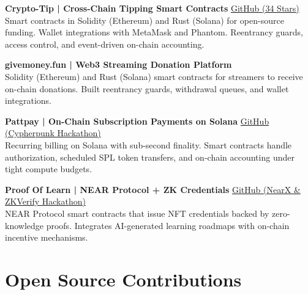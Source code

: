 \documentclass[10pt,a4paper]{article}
\begin{document}
\vspace{2pt}
\noindent\textbf{\footnotesize Crypto-Tip | Cross-Chain Tipping Smart Contracts} \textbullet{} {\footnotesize\href{https://github.com/Dnreikronos/crypto-tip}{GitHub (34 Stars)}}\\
{\footnotesize Smart contracts in Solidity (Ethereum) and Rust (Solana) for open-source funding. Wallet integrations with MetaMask and Phantom. Reentrancy guards, access control, and event-driven on-chain accounting.}

\vspace{2pt}
\noindent\textbf{\footnotesize givemoney.fun | Web3 Streaming Donation Platform}\\
{\footnotesize Solidity (Ethereum) and Rust (Solana) smart contracts for streamers to receive on-chain donations. Built reentrancy guards, withdrawal queues, and wallet integrations.}

\vspace{2pt}
\noindent\textbf{\footnotesize Pattpay | On-Chain Subscription Payments on Solana} \textbullet{} {\footnotesize\href{https://github.com/Dnreikronos/pattpay}{GitHub (Cypherpunk Hackathon)}}\\
{\footnotesize Recurring billing on Solana with sub-second finality. Smart contracts handle authorization, scheduled SPL token transfers, and on-chain accounting under tight compute budgets.}

\vspace{2pt}
\noindent\textbf{\footnotesize Proof Of Learn | NEAR Protocol + ZK Credentials} \textbullet{} {\footnotesize\href{https://github.com/Dnreikronos/proof-of-learn}{GitHub (NearX \& ZKVerify Hackathon)}}\\
{\footnotesize NEAR Protocol smart contracts that issue NFT credentials backed by zero-knowledge proofs. Integrates AI-generated learning roadmaps with on-chain incentive mechanisms.}

\section{Open Source Contributions}
\end{document}
